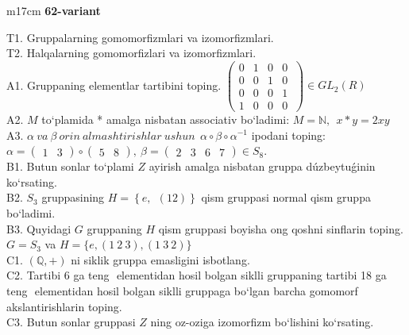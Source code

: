 \documentclass{article}
\begin{document}
\begin{tabular}{m{17cm}}
\textbf{62-variant}
\newline

T1. Gruppalarning gomomorfizmlari va izomorfizmlari. \\
T2. Halqalarning gomomorfizlari va izomorfizmlari. \\
A1. Gruppaning elementlar tartibini toping. \(\left( \begin{matrix}
0 & 1 & 0 & 0 \\
0 & 0 & 1 & 0 \\
0 & 0 & 0 & 1 \\
1 & 0 & 0 & 0
\end{matrix}\  \right) \in GL_{2}(R)\) \\
A2. \(M\) to`plamida * amalga nisbatan associativ bo`ladimi: \(M\mathbb{= N},\ \ x*y = 2xy\) \\
A3. \(\alpha\ va\ \beta\ orin\ almashtirishlar\ ushun\ \ \alpha \circ \beta \circ \alpha^{- 1}\) ipodani toping:\(\alpha = \begin{pmatrix}
1 & 3
\end{pmatrix} \circ \begin{pmatrix}
5 & 8
\end{pmatrix},\ \beta = \begin{pmatrix}
2 & 3 & 6 & 7
\end{pmatrix} \in S_{8}\). \\
B1. Butun sonlar to`plami \(Z\) ayirish amalga nisbatan gruppa dúzbeytuǵinin ko`rsating. \\
B2. \(S_{3}\) gruppasining \(H = \left\{ e,\ \ (12) \right\}\) qism gruppasi normal qism gruppa bo`ladimi. \\
B3. Quyidagi \(G\) gruppaning \(H\) qism gruppasi boyisha o\textquotesingle ng qo\textquotesingle shni sinflarin toping. \(G = S_{3}\) va \(H = \{ e,(1\ 2\ 3),(1\ 3\ 2)\}\) \\
C1. \((\mathbb{Q}, + )\) ni siklik gruppa emasligini isbotlang. \\
C2. Tartibi 6 ga teng \(< a >\) elementidan hosil bo\textquotesingle lgan siklli gruppaning tartibi 18 ga teng \(< b >\) elementidan hosil bo\textquotesingle lgan siklli gruppaga bo`lgan barcha gomomorf akslantirishlarin toping. \\
C3. Butun sonlar gruppasi \(Z\) ning o\textquotesingle z-o\textquotesingle ziga izomorfizm bo`lishini ko`rsating. \\

\end{tabular}
\vspace{1cm}
\end{document}
